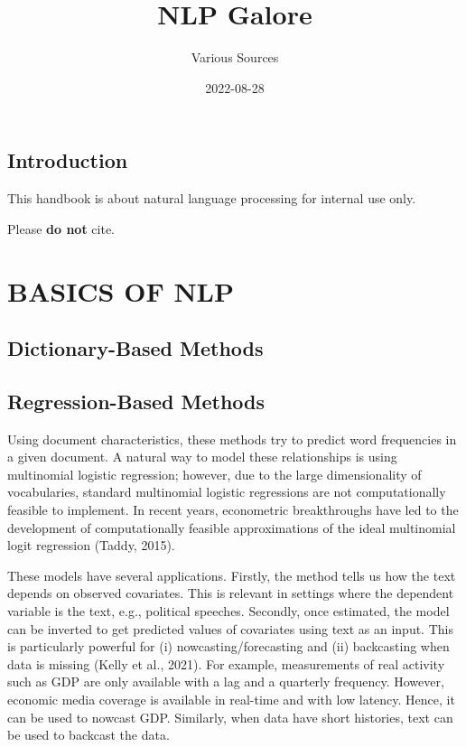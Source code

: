 \documentclass[
]{book}
\title{NLP Galore}
\author{Various Sources}
\date{2022-08-28}
\begin{document}
\maketitle

{
\setcounter{tocdepth}{1}
\tableofcontents
}
\hypertarget{introduction}{%
\chapter{Introduction}\label{introduction}}

This handbook is about natural language processing for internal use only.

Please \textbf{do not} cite.

\hypertarget{part-basics-of-nlp}{%
\part*{BASICS OF NLP}\label{part-basics-of-nlp}}

\hypertarget{dictionary-based-methods}{%
\chapter{Dictionary-Based Methods}\label{dictionary-based-methods}}

\hypertarget{regression-based-methods}{%
\chapter{Regression-Based Methods}\label{regression-based-methods}}

Using document characteristics, these methods try to predict word frequencies in a given document. A natural way to model these relationships is using multinomial logistic regression; however, due to the large dimensionality of vocabularies, standard multinomial logistic regressions are not computationally feasible to implement. In recent years, econometric breakthroughs have led to the development of computationally feasible approximations of the ideal multinomial logit regression (Taddy, 2015).

These models have several applications. Firstly, the method tells us how the text depends on observed covariates. This is relevant in settings where the dependent variable is the text, e.g., political speeches. Secondly, once estimated, the model can be inverted to get predicted values of covariates using text as an input. This is particularly powerful for (i) nowcasting/forecasting and (ii) backcasting when data is missing (Kelly et al., 2021). For example, measurements of real activity such as GDP are only available with a lag and a quarterly frequency. However, economic media coverage is available in real-time and with low latency. Hence, it can be used to nowcast GDP. Similarly, when data have short histories, text can be used to backcast the data.
\end{document}
